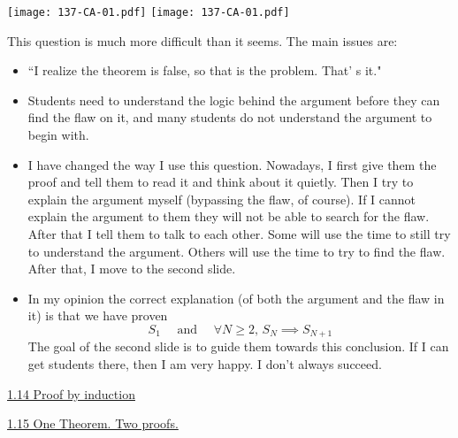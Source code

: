 \documentclass[11pt]{article}
\newcommand{\nl}{\hfill \vspace{-1.1\baselineskip}} %
\newcommand{\vfourteen}{\hspace{8mm}\href{https://www.youtube.com/watch?v=NmgABEiwgLg&list=PLlwePzQY_wW-CPzhk-af-MXj9knthD1gx&index=14}{1.14 Proof by induction}}
\newcommand{\vfifteen}{\hspace{8mm}\href{https://www.youtube.com/watch?v=WPP2TDPXyc8&list=PLlwePzQY_wW-CPzhk-af-MXj9knthD1gx&index=15}{1.15 One Theorem. Two proofs.}}
\begin{document}
\begin{center}
{ \texttt{[image: 137-CA-01.pdf]}}
\quad
{ \texttt{[image: 137-CA-01.pdf]}}
\end{center}

\begin{warning}
This question is much more difficult than it seems.    The main issues are:
		\begin{itemize}
			\item  ``I realize the theorem is false, so that is the problem.   That' s it."
			\item   Students need to understand the logic behind the argument before they can find the flaw on it, and many students do not understand the argument to begin with.
		\end{itemize}
\end{warning}

\begin{comments}
\nl
\begin{itemize}
	\item  I have changed the way I use this question.  Nowadays, I first give them the proof and tell them to read it and think about it quietly.  Then I try to explain the argument myself (bypassing the flaw, of course).  If I cannot explain the argument to them they will not be able to search for the flaw.  After that I tell them to talk to each other.  Some will use the time to still try to understand the argument.  Others will use the time to try to find the flaw.  After that, I move to the second slide.  
	\item In my opinion the correct explanation (of both the argument and the flaw in it) is that we have proven
		$$
			S_1 \quad \mbox{ and } \quad \forall N \geq 2, \, S_N \implies S_{N+1}
		$$
		The goal of the second slide is to guide them towards this conclusion.  If I can get students there, then I am very happy.  I don't always succeed.
\end{itemize}
\end{comments}

\begin{videos}
\vfourteen

\vfifteen
\end{videos}



\end{document}
